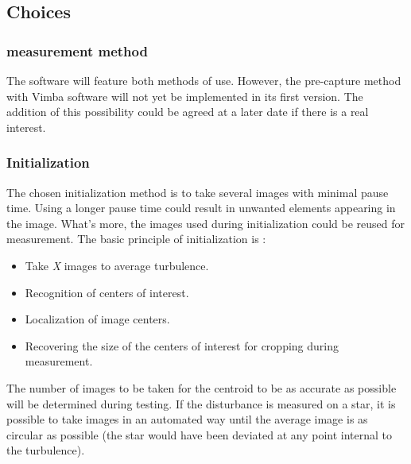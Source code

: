 \subsection{Choices}
\subsubsection{measurement method}
The software will feature both methods of use. However, the pre-capture method with Vimba software will not yet be implemented in its first version.
The addition of this possibility could be agreed at a later date if there is a real interest.
\subsubsection{Initialization}
The chosen initialization method is to take several images with minimal pause time. \newline
Using a longer pause time could result in unwanted elements appearing in the image.
What's more, the images used during initialization could be reused for measurement. The basic principle of initialization is :
\begin{itemize}
    \item Take \textit{X} images to average turbulence.
    \item Recognition of centers of interest.
    \item Localization of image centers.
    \item Recovering the size of the centers of interest for cropping during measurement.
\end{itemize}
The number of images to be taken for the centroid to be as accurate as possible will be determined during testing.
If the disturbance is measured on a star, it is possible to take images in an automated way until the average image
is as circular as possible (the star would have been deviated at any point internal to the turbulence).
